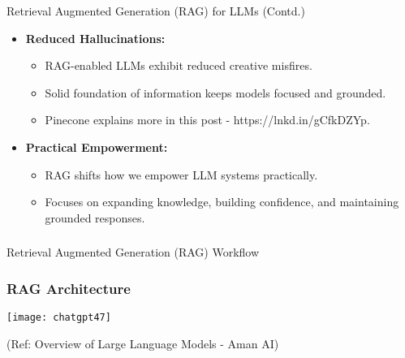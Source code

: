 \begin{frame}[fragile]{Retrieval Augmented Generation (RAG) for LLMs (Contd.)}

\begin{itemize}
  \item \textbf{Reduced Hallucinations:}
    \begin{itemize}
      \item RAG-enabled LLMs exhibit reduced creative misfires.
      \item Solid foundation of information keeps models focused and grounded.
      \item Pinecone explains more in this post - https://lnkd.in/gCfkDZYp.
    \end{itemize}

  \item \textbf{Practical Empowerment:}
    \begin{itemize}
      \item RAG shifts how we empower LLM systems practically.
      \item Focuses on expanding knowledge, building confidence, and maintaining grounded responses.
    \end{itemize}
\end{itemize}

\end{frame}

\begin{frame}[fragile]\frametitle{}
\begin{center}
{\Large Retrieval Augmented Generation (RAG) Workflow}
\end{center}
\end{frame}


\begin{frame}[fragile]\frametitle{RAG Architecture}


		\begin{center}
		\texttt{[image: chatgpt47]}
		\end{center}

{\tiny (Ref: Overview of Large Language Models - Aman AI)}

\end{frame}



